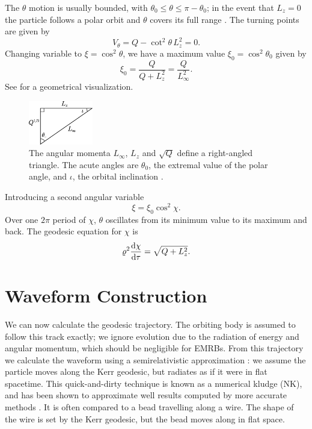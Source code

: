 The $\theta$ motion is usually bounded, with $\theta_0 \leq \theta \leq \pi - \theta_0$; in the event that $L_z = 0$ the particle follows a polar orbit and $\theta$ covers its full range \citep{Wilkins1972}. The turning points are given by
\begin{equation}
V_\theta = Q - \cot^2\theta\, L_z^2 = 0.
\end{equation}
Changing variable to $\xi = \cos^2\theta$, we have a maximum value $\xi_0 = \cos^2\theta_0$ given by
\begin{equation}
\xi_0 = \frac{Q}{Q+L_z^2} = \frac{Q}{L_\infty^2}.
\label{eq:theta_0}
\end{equation}
See  for a geometrical visualization.
\begin{figure}
\begin{center}
\includegraphics[width=0.25\textwidth]{./images/Triangle.eps}
    \caption{The angular momenta $L_\infty$, $L_z$ and $\sqrt{Q}$ define a right-angled triangle. The acute angles are $\theta_0$, the extremal value of the polar angle, and $\iota$, the orbital inclination \citep{Glampedakis2002}.\label{fig:L_triangle}}
\end{center}
\end{figure}
Introducing a second angular variable \citep{Drasco2004}
\begin{equation}
\xi = \xi_0\cos^2\chi.
\end{equation}
Over one $2\pi$ period of $\chi$, $\theta$ oscillates from its minimum value to its maximum and back. The geodesic equation for $\chi$ is
\begin{equation}
\varrho^2\frac{\mathrm{d} {\chi}}{\mathrm{d} {\tau}} = \sqrt{Q + L_z^2}.
\end{equation}

\section{Waveform Construction}\label{sec:Kludge}

We can now calculate the geodesic trajectory. The orbiting body is assumed to follow this track exactly; we ignore evolution due to the radiation of energy and angular momentum, which should be negligible for EMRBs. From this trajectory we calculate the waveform using a semirelativistic approximation \citep{Ruffini1981}: we assume the particle moves along the Kerr geodesic, but radiates as if it were in flat spacetime. This quick-and-dirty technique is known as a numerical kludge (NK), and has been shown to approximate well results computed by more accurate methods \citep{Babak2007}. It is often compared to a bead travelling along a wire. The shape of the wire is set by the Kerr geodesic, but the bead moves along in flat space.

